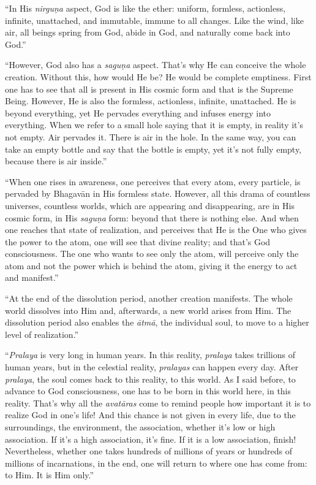 \enquote{In His \textit{nirguṇa} aspect, God is like the ether: uniform, formless, actionless, infinite, unattached, and immutable, immune to all changes. Like the wind, like air, all beings spring from God, abide in God, and naturally come back into God.}

\enquote{However, God also has a \textit{saguṇa} aspect. That’s why He can conceive the whole creation. Without this, how would He be? He would be complete emptiness. First one has to see that all is present in His cosmic form and that is the Supreme Being. However, He is also the formless, actionless, infinite, unattached. He is beyond everything, yet He pervades everything and infuses energy into everything. When we refer to a small hole saying that it is empty, in reality it’s not empty. Air pervades it. There is air in the hole. In the same way, you can take an empty bottle and say that the bottle is empty, yet it’s not fully empty, because there is air inside.}

\enquote{When one rises in awareness, one perceives that every atom, every particle, is pervaded by Bhagavān in His formless state. However, all this drama of countless universes, countless worlds, which are appearing and disappearing, are in His cosmic form, in His \textit{saguṇa} form: beyond that there is nothing else. And when one reaches that state of realization, and perceives that He is the One who gives the power to the atom, one will see that divine reality; and that’s God consciousness. The one who wants to see only the atom, will perceive only the atom and not the power which is behind the atom, giving it the energy to act and manifest.}

\enquote{At the end of the dissolution period, another creation manifests. The whole world dissolves into Him and, afterwards, a new world arises from Him. The dissolution period also enables the \textit{ātmā}, the individual soul, to move to a higher level of realization.}

\enquote{\textit{Pralaya} is very long in human years. In this reality, \textit{pralaya} takes trillions of human years, but in the celestial reality, \textit{pralayas} can happen every day. After \textit{pralaya}, the soul comes back to this reality, to this world. As I said before, to advance to God consciousness, one has to be born in this world here, in this reality. That’s why all the \textit{avatāras} come to remind people how important it is to realize God in one’s life! And this chance is not given in every life, due to the surroundings, the environment, the association, whether it’s low or high association. If it’s a high association, it’s fine. If it is a low association, finish! Nevertheless, whether one takes hundreds of millions of years or hundreds of millions of incarnations, in the end, one will return to where one has come from: to Him. It is Him only.}


